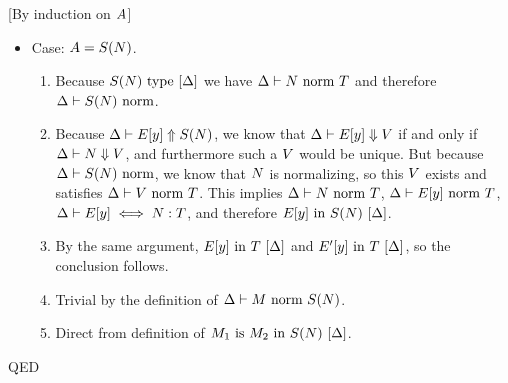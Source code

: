 \documentclass{article}
\newcommand{\qed}{\mbox{QED}}
\newenvironment{proof}{\noindent{\bf Proof:}\hspace*{0.5em}}{\hspace*{\fill}\qed}
\theoremstyle{break}
\begin{document}
\begin{proof}[By induction on $A$]
\begin{itemize}
\item Case: $A=S(N)$.
\begin{enumerate}
\item Because ${S(N)}\mathrm{\ type\ }[\Delta]$ we have
${\Delta}\vdash{N}\mbox{\ norm\ }{T}$ and therefore
${\Delta}\vdash{S(N)}\mbox{\ norm}$.
\item Because $\Delta\vdash E[y] \Uparrow S(N)$, we
know that $\Delta\vdash E[y] \Downarrow V$ if
and only if
$\Delta\vdash N \Downarrow V$, and
furthermore such a $V$ would be unique.  But because
${\Delta}\vdash{S(N)}\mbox{\ norm}$, we know that
$N$ is normalizing, so this $V$ exists and
satisfies ${\Delta}\vdash{V}\mbox{\ norm\ }{T}$.  This implies
${\Delta}\vdash{N}\mbox{\ norm\ }{T}$,
${\Delta}\vdash{E[y]}\mbox{\ norm\ }{T}$,
$\Delta\vdash E[y] \iff N : T$, and
therefore ${E[y]}\mathrm{\ in\ }{S(N)}\ [\Delta]$.
\item By the same argument,
${E[y]}\mathrm{\ in\ }{T}\ [\Delta]$ and
${E'[y]}\mathrm{\ in\ }{T}\ [\Delta]$, so
the conclusion follows.
\item Trivial by the definition of 
${\Delta}\vdash{M}\mbox{\ norm\ }{S(N)}$.
\item Direct from definition of
${M_1}\mathrm{\ is\ }{M_2}\mathrm{\ in\ }{S(N)}\ [\Delta]$.
\end{enumerate}


\end{itemize}
\end{proof}
\end{document}
